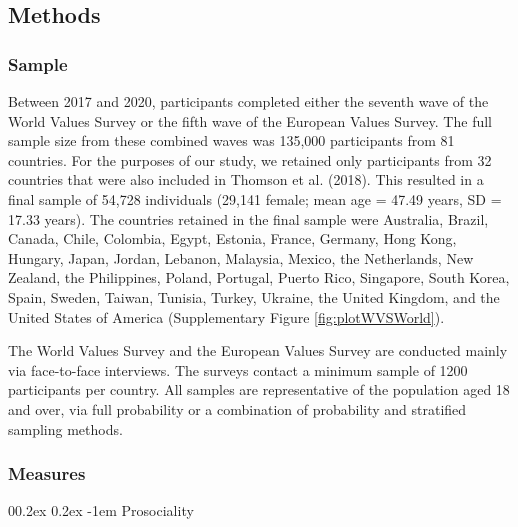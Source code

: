 \documentclass[
  man,floatsintext]{apa6}
\makeatletter
\let\oldparagraph\paragraph
\renewcommand{\paragraph}[1]{\oldparagraph{#1}\mbox{}}
\renewcommand{\paragraph}{\@startsection{paragraph}{4}{\parindent}%
  {0\baselineskip \@plus 0.2ex \@minus 0.2ex}%
  {-1em}%
  {\normalfont\normalsize\bfseries\itshape\typesectitle}}
\makeatother
\begin{document}
\hypertarget{methods-1}{%
\subsection{Methods}\label{methods-1}}

\hypertarget{sample-1}{%
\subsubsection{Sample}\label{sample-1}}

Between 2017 and 2020, participants completed either the seventh wave of the World Values Survey or the fifth wave of the European Values Survey. The full sample size from these combined waves was 135,000 participants from 81 countries. For the purposes of our study, we retained only participants from 32 countries that were also included in Thomson et al. (2018). This resulted in a final sample of 54,728 individuals (29,141 female; mean age = 47.49 years, SD = 17.33 years). The countries retained in the final sample were Australia, Brazil, Canada, Chile, Colombia, Egypt, Estonia, France, Germany, Hong Kong, Hungary, Japan, Jordan, Lebanon, Malaysia, Mexico, the Netherlands, New Zealand, the Philippines, Poland, Portugal, Puerto Rico, Singapore, South Korea, Spain, Sweden, Taiwan, Tunisia, Turkey, Ukraine, the United Kingdom, and the United States of America (Supplementary Figure \ref{fig:plotWVSWorld}).

The World Values Survey and the European Values Survey are conducted mainly via face-to-face interviews. The surveys contact a minimum sample of 1200 participants per country. All samples are representative of the population aged 18 and over, via full probability or a combination of probability and stratified sampling methods.

\hypertarget{measures-1}{%
\subsubsection{Measures}\label{measures-1}}

\hypertarget{prosociality-1}{%
\paragraph{Prosociality}\label{prosociality-1}}
\end{document}
